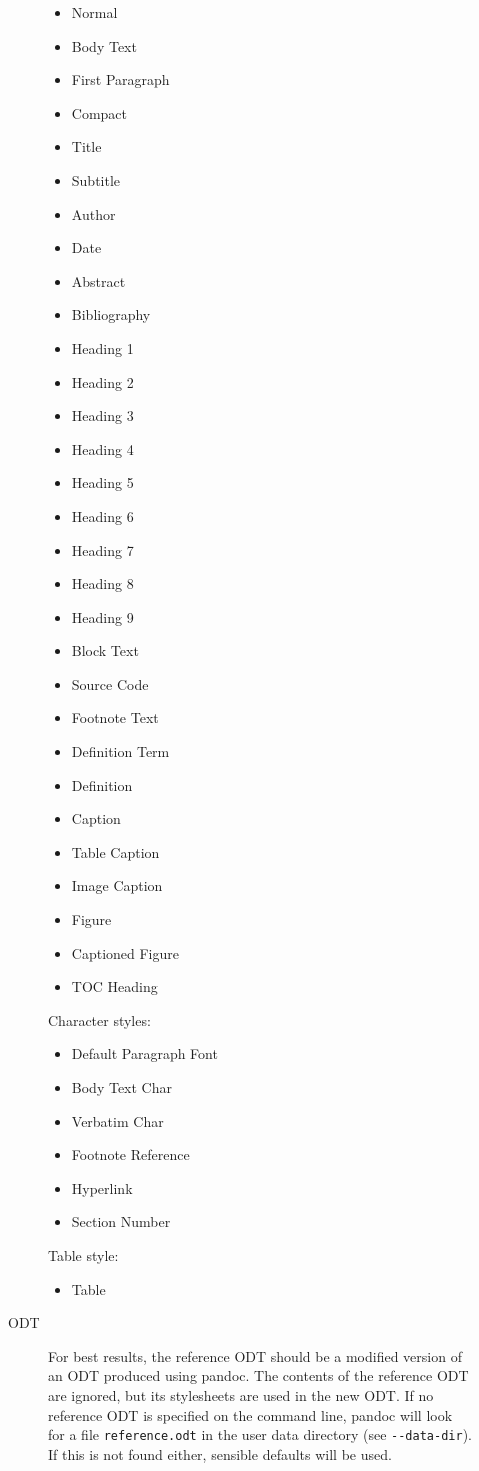 \documentclass[
]{article}
\providecommand{\tightlist}{%
  \setlength{\itemsep}{0pt}\setlength{\parskip}{0pt}}
\begin{document}
\begin{description}
\begin{description}
\begin{itemize}
\tightlist
\item
  Normal
\item
  Body Text
\item
  First Paragraph
\item
  Compact
\item
  Title
\item
  Subtitle
\item
  Author
\item
  Date
\item
  Abstract
\item
  Bibliography
\item
  Heading 1
\item
  Heading 2
\item
  Heading 3
\item
  Heading 4
\item
  Heading 5
\item
  Heading 6
\item
  Heading 7
\item
  Heading 8
\item
  Heading 9
\item
  Block Text
\item
  Source Code
\item
  Footnote Text
\item
  Definition Term
\item
  Definition
\item
  Caption
\item
  Table Caption
\item
  Image Caption
\item
  Figure
\item
  Captioned Figure
\item
  TOC Heading
\end{itemize}

Character styles:

\begin{itemize}
\tightlist
\item
  Default Paragraph Font
\item
  Body Text Char
\item
  Verbatim Char
\item
  Footnote Reference
\item
  Hyperlink
\item
  Section Number
\end{itemize}

Table style:

\begin{itemize}
\tightlist
\item
  Table
\end{itemize}
\item[ODT]
For best results, the reference ODT should be a modified version of an
ODT produced using pandoc. The contents of the reference ODT are
ignored, but its stylesheets are used in the new ODT. If no reference
ODT is specified on the command line, pandoc will look for a file
\texttt{reference.odt} in the user data directory (see
\texttt{-\/-data-dir}). If this is not found either, sensible defaults
will be used.


\end{description}
\end{description}
\end{document}
